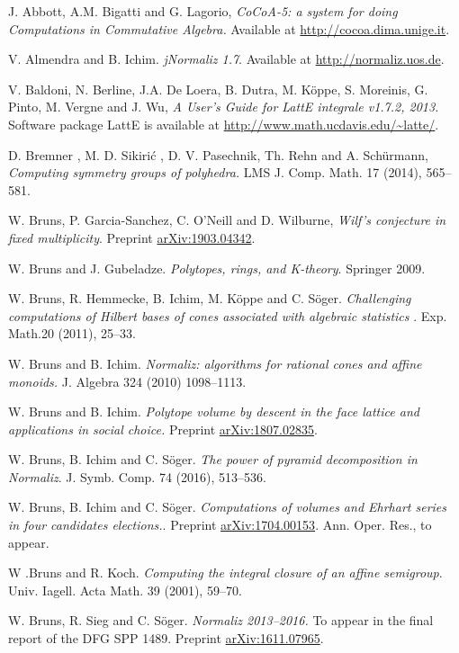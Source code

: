 \documentclass[12pt,a4paper]{scrartcl}
\theoremstyle{definition}
\begin{document}
\begin{thebibliography}{15.}
\small

J. Abbott, A.M. Bigatti and G. Lagorio,
\emph{CoCoA-5: a system for doing {C}omputations in {C}ommutative {A}lgebra.}
Available at \url{http://cocoa.dima.unige.it}.

 V. Almendra  and B. Ichim. {\em  jNormaliz 1.7}.
Available at \url{http://normaliz.uos.de}.

 V. Baldoni, N. Berline, J.A. De Loera, B. Dutra, M. K\"oppe, S. Moreinis, G. Pinto, M. Vergne and  J. Wu,
\emph{A User's Guide for LattE integrale v1.7.2, 2013.} Software package
LattE is available at \url{http://www.math.ucdavis.edu/~latte/}.

D. Bremner , M. D. Sikiri\'c , D. V. Pasechnik, Th. Rehn and A. Schürmann,
\emph{Computing symmetry groups of polyhedra.}
LMS J. Comp. Math. 17 (2014), 565--581.

 W. Bruns, P. Garcia-Sanchez, C. O'Neill and D. Wilburne, \emph{Wilf's conjecture in fixed multiplicity}. Preprint \url{arXiv:1903.04342}.


 W. Bruns and J. Gubeladze. {\em Polytopes, rings, and K-theory}.
Springer 2009.

 W. Bruns, R. Hemmecke, B. Ichim, M. K\"oppe and C. S\"oger.
{\em Challenging computations of Hilbert bases of cones associated with
algebraic statistics }. Exp. Math.20 (2011), 25--33.

 W. Bruns and B. Ichim. {\em Normaliz: algorithms for rational cones and affine monoids.}
J. Algebra 324 (2010) 1098--1113.

 W. Bruns and B. Ichim. {\em Polytope volume by descent in the face lattice and applications in social choice.} Preprint \url{arXiv:1807.02835}.

 W. Bruns, B. Ichim and C. S\"oger. {\em The power of
pyramid decomposition in Normaliz}. J. Symb. Comp. 74 (2016), 513--536.

 W. Bruns, B. Ichim and C. S\"oger. {\em Computations of volumes and Ehrhart series in four candidates elections.}. Preprint \url{arXiv:1704.00153}. Ann. Oper. Res., to appear.

 W .Bruns and R. Koch. {\em Computing the integral
closure of an affine semigroup}. Univ. Iagell. Acta Math.
39 (2001), 59--70.

 W. Bruns, R. Sieg and C. S\"oger. {\em Normaliz 2013--2016.} To appear in the final report of the DFG SPP 1489. Preprint \url{ arXiv:1611.07965}.


\end{thebibliography}
\end{document}
